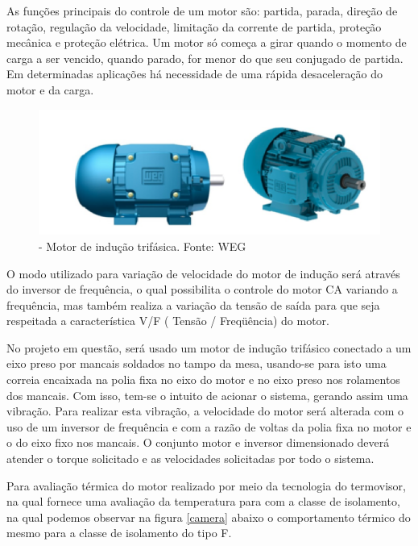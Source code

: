 As funções principais do controle de um motor são: partida, parada, direção de rotação, regulação da velocidade, limitação da corrente de partida, proteção mecânica e proteção elétrica. Um motor só começa a girar quando o momento de carga a ser vencido, quando parado, for menor do que seu conjugado de partida. Em determinadas aplicações há necessidade de uma rápida desaceleração do motor e da carga.

\begin{figure}[h!]
	\centering
		\includegraphics[keepaspectratio=true,scale=0.6]{figuras/2.png}
	\caption{- Motor de indução trifásica. Fonte: WEG}
    \label{motor}
\end{figure}

O modo utilizado para variação de velocidade do motor de indução será através do inversor de frequência, o qual possibilita o controle do motor CA variando a frequência, mas também realiza a variação da tensão de saída para que seja respeitada a característica V/F ( Tensão / Freqüência) do motor.

No projeto em questão, será usado um motor de indução trifásico conectado a um eixo preso por mancais soldados no tampo da mesa, usando-se para isto uma correia encaixada na polia fixa no eixo do motor e no eixo preso nos rolamentos dos mancais. Com isso, tem-se o intuito de acionar o sistema, gerando assim uma vibração. Para realizar esta vibração, a velocidade do motor será alterada com o uso de um inversor de frequência e com a razão de voltas da polia fixa no motor e o do eixo fixo nos mancais. O conjunto motor e inversor dimensionado deverá atender o torque solicitado e as velocidades solicitadas por todo o sistema.

	Para avaliação térmica do motor realizado por meio da tecnologia do termovisor, na qual fornece uma avaliação da temperatura para com a classe de isolamento, na qual podemos observar na figura \ref{camera} abaixo o comportamento térmico do mesmo para a classe de isolamento do tipo F.

